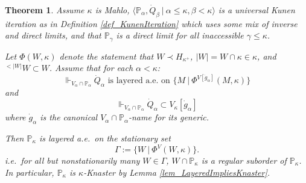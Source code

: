 \documentclass{amsart}
\newtheorem{theorem}{Theorem}
\begin{document}
\begin{theorem}\label{thm_MainTheorem_Mahlo_Precise}
Assume $\kappa$ is Mahlo, $\langle \mathbb{P}_\alpha, \dot{Q}_\beta \ | \ \alpha \le \kappa, \beta < \kappa \rangle$ is a universal Kunen iteration as in Definition \ref{def_KunenIteration} which uses some mix of inverse and direct limits, and that $\mathbb{P}_\gamma$ is a direct limit for all inaccessible $\gamma \le \kappa$.  

Let $\Phi(W,\kappa)$ denote the statement that $W \prec H_{\kappa^+}$, $|W|=W \cap \kappa \in \kappa$, and ${}^{<|W|} W \subset W$.  Assume that for each $\alpha < \kappa$:
\begin{equation*}
\Vdash_{V_\alpha \cap \mathbb{P}_\alpha} \dot{Q}_\alpha \text{ is layered a.e. on } \{ M  \ | \  \Phi^{V[\dot{g}_\alpha]}(M,\kappa) \} 
\end{equation*}
and
\begin{equation*}
\Vdash_{V_\alpha \cap \mathbb{P}_\alpha} \dot{Q}_\alpha \subset V_\kappa[\dot{g}_\alpha]
\end{equation*}
where $\dot{g}_\alpha$ is the canonical $V_\alpha \cap \mathbb{P}_\alpha$-name for its generic.

Then $\mathbb{P}_\kappa$ is layered a.e.\ on the stationary set
\begin{equation*}
\Gamma:= \{  W \ | \ \Phi^V(W,\kappa) \}.
\end{equation*}
i.e.\ for all but nonstationarily many $W \in \Gamma$, $W \cap \mathbb{P}_\kappa$ is a regular suborder of $\mathbb{P}_\kappa$.  In particular, $\mathbb{P}_\kappa$ is $\kappa$-Knaster by Lemma \ref{lem_LayeredImpliesKnaster}.
\end{theorem}
\end{document}
